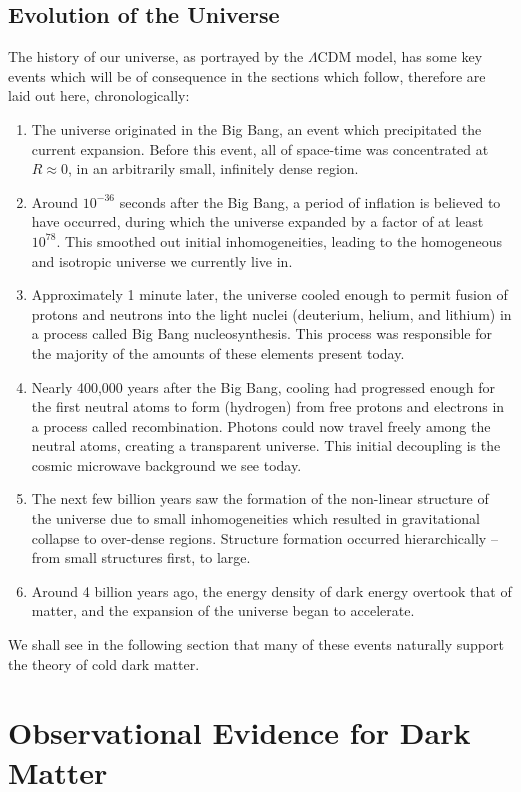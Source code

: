 \documentclass{report}
\begin{document}
\subsection{Evolution of the Universe}
The history of our universe, as portrayed by the $\Lambda$CDM model, has some key events which will be of consequence in the sections which follow, therefore are laid out here, chronologically:
\begin{enumerate}
\item The universe originated in the Big Bang, an event which precipitated the current expansion. Before this event, all of space-time was concentrated at $R \approx 0$, in an arbitrarily small, infinitely dense region.
\item Around $10^{-36}$ seconds after the Big Bang, a period of inflation is believed to have occurred, during which the universe expanded by a factor of at least $10^{78}$. This smoothed out initial inhomogeneities, leading to the homogeneous and isotropic universe we currently live in.
\item Approximately 1 minute later, the universe cooled enough to permit fusion of protons and neutrons into the light nuclei (deuterium, helium, and lithium) in a process called Big Bang nucleosynthesis. This process was responsible for the majority of the amounts of these elements present today.
\item Nearly 400,000 years after the Big Bang, cooling had progressed enough for the first neutral atoms to form (hydrogen) from free protons and electrons in a process called recombination. Photons could now travel freely among the neutral atoms, creating a transparent universe. This initial decoupling is the cosmic microwave background we see today.
\item The next few billion years saw the formation of the non-linear structure of the universe due to small inhomogeneities which resulted in gravitational collapse to over-dense regions. Structure formation occurred hierarchically -- from small structures first, to large.
\item Around 4 billion years ago, the energy density of dark energy overtook that of matter, and the expansion of the universe began to accelerate.
\end{enumerate}

We shall see in the following section that many of these events naturally support the theory of cold dark matter.

\section{Observational Evidence for Dark Matter}
\end{document}
